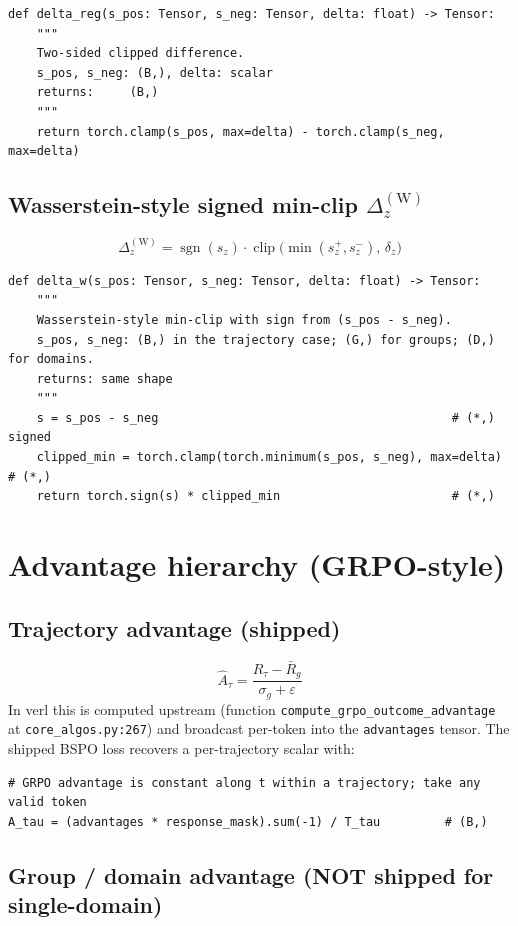 \documentclass{article}
\begin{document}
\begin{lstlisting}
def delta_reg(s_pos: Tensor, s_neg: Tensor, delta: float) -> Tensor:
    """
    Two-sided clipped difference.
    s_pos, s_neg: (B,), delta: scalar
    returns:     (B,)
    """
    return torch.clamp(s_pos, max=delta) - torch.clamp(s_neg, max=delta)
\end{lstlisting}

\subsection{Wasserstein-style signed min-clip $\Delta_z^{(\text{W})}$}
\[
\Delta_z^{(\text{W})} = \operatorname{sgn}(s_z) \cdot
  \operatorname{clip}\bigl(\min(s_z^+, s_z^-), \, \delta_z\bigr)
\]

\begin{lstlisting}
def delta_w(s_pos: Tensor, s_neg: Tensor, delta: float) -> Tensor:
    """
    Wasserstein-style min-clip with sign from (s_pos - s_neg).
    s_pos, s_neg: (B,) in the trajectory case; (G,) for groups; (D,) for domains.
    returns: same shape
    """
    s = s_pos - s_neg                                         # (*,) signed
    clipped_min = torch.clamp(torch.minimum(s_pos, s_neg), max=delta)  # (*,)
    return torch.sign(s) * clipped_min                        # (*,)
\end{lstlisting}

\section{Advantage hierarchy (GRPO-style)}

\subsection{Trajectory advantage (shipped)}
\[
\hat A_\tau = \frac{R_\tau - \bar R_g}{\sigma_g + \varepsilon}
\]
In verl this is computed upstream (function \texttt{compute\_grpo\_outcome\_advantage}
at \texttt{core\_algos.py:267}) and broadcast per-token into the
\texttt{advantages} tensor. The shipped BSPO loss recovers a
per-trajectory scalar with:

\begin{lstlisting}
# GRPO advantage is constant along t within a trajectory; take any valid token
A_tau = (advantages * response_mask).sum(-1) / T_tau         # (B,)
\end{lstlisting}

\subsection{Group / domain advantage (NOT shipped for single-domain)}
\end{document}
